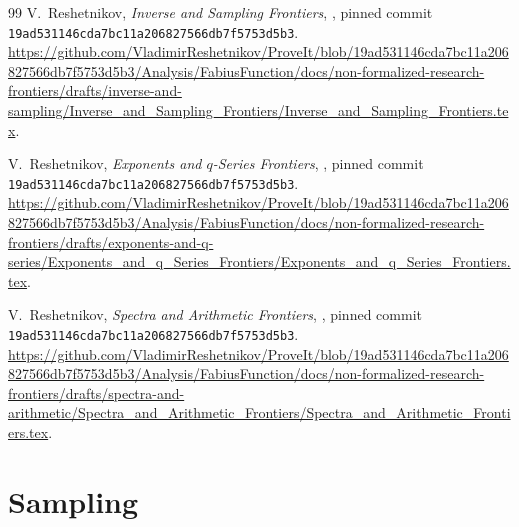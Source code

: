 \documentclass[11pt,oneside]{article}
\renewcommand{\headrulewidth}{0.4pt}
\theoremstyle{definition}
\begin{document}
\begin{thebibliography}{99}
V.~Reshetnikov,
\newblock \emph{Inverse and Sampling Frontiers},
\newblock \repo, pinned commit
\nolinkurl{19ad531146cda7bc11a206827566db7f5753d5b3}.
\newblock \url{https://github.com/VladimirReshetnikov/ProveIt/blob/19ad531146cda7bc11a206827566db7f5753d5b3/Analysis/FabiusFunction/docs/non-formalized-research-frontiers/drafts/inverse-and-sampling/Inverse_and_Sampling_Frontiers/Inverse_and_Sampling_Frontiers.tex}.

V.~Reshetnikov,
\newblock \emph{Exponents and $q$-Series Frontiers},
\newblock \repo, pinned commit
\nolinkurl{19ad531146cda7bc11a206827566db7f5753d5b3}.
\newblock \url{https://github.com/VladimirReshetnikov/ProveIt/blob/19ad531146cda7bc11a206827566db7f5753d5b3/Analysis/FabiusFunction/docs/non-formalized-research-frontiers/drafts/exponents-and-q-series/Exponents_and_q_Series_Frontiers/Exponents_and_q_Series_Frontiers.tex}.

V.~Reshetnikov,
\newblock \emph{Spectra and Arithmetic Frontiers},
\newblock \repo, pinned commit
\nolinkurl{19ad531146cda7bc11a206827566db7f5753d5b3}.
\newblock \url{https://github.com/VladimirReshetnikov/ProveIt/blob/19ad531146cda7bc11a206827566db7f5753d5b3/Analysis/FabiusFunction/docs/non-formalized-research-frontiers/drafts/spectra-and-arithmetic/Spectra_and_Arithmetic_Frontiers/Spectra_and_Arithmetic_Frontiers.tex}.

\end{thebibliography}
\endgroup


\renewcommand{\headrulewidth}{0.3pt}
\newcommand{\wtPartl}{\operatorname{wt}_2}
\newcommand{\Li}{\operatorname{Li}}
\newcommand{\Log}{\operatorname{Log}}
\newcommand{\PV}{\operatorname{PV}}
\newcommand{\diag}{\operatorname{diag}}
\newcommand{\tr}{\operatorname{tr}}
\newcommand{\dist}{\operatorname{dist}}
\newcommand{\polylog}{\operatorname{Li}}
\newcommand{\littleo}{o}
\newcommand{\cO}{\mathcal O}
\newcommand{\cK}{\mathcal K}
\newcommand{\cL}{\mathcal L}
\newcommand{\cS}{\mathcal S}
\newcommand{\one}{\mathbf 1}
\newcommand{\statusknownPartl}{\textsf{K}}
\newcommand{\statusderivedPartl}{\textsf{D}}
\newcommand{\statusnewPartl}{\textsf{N}}

\part{Sampling}
\end{document}
